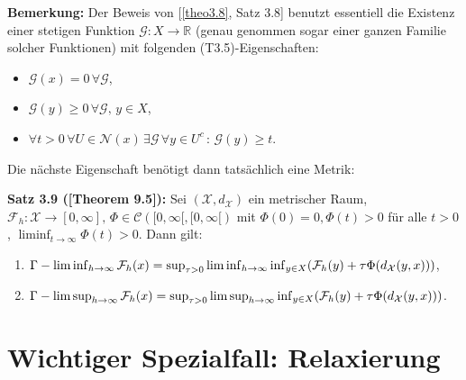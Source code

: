 \textbf{Bemerkung:} Der Beweis von [\ref{theo3.8}, Satz 3.8] benutzt essentiell die Existenz einer stetigen Funktion \(\mathcal{G} : X \to \mathbb{R}\) (genau genommen sogar einer ganzen Familie solcher Funktionen) mit folgenden (T3.5)-Eigenschaften:
\begin{itemize}
    \item \(\mathcal{G}(x)=0 \, \forall \mathcal{G}\),
    \item \(\mathcal{G}(y) \geq 0 \, \forall \mathcal{G}, \, y \in X\),
    \item \(\forall t > 0 \, \forall U \in \mathcal{N}(x) \, \exists \mathcal{G} \, \forall y \in U^c \, : \, \mathcal{G}(y) \geq t\).
\end{itemize}
Die nächste Eigenschaft benötigt dann tatsächlich eine Metrik:\\[0.5cm]
\colorbox{generalYellow}{\begin{minipage}{16cm}{\textcolor{black}{}{\label{theo3.9}}}
\textbf{Satz 3.9 (\cite{MasoGamma}[Theorem 9.5]):} Sei \((\mathcal{X},d_{\mathcal{X}})\) ein metrischer Raum, \(\mathcal{F}_h : \mathcal{X} \to [0,\infty], \, \Phi \in \mathcal{C}([0,\infty[,[0,\infty[)\) mit \(\Phi(0) = 0, \Phi(t) > 0 \) für alle \(t > 0\), \(\liminf_{t \to \infty} \Phi(t) > 0\). Dann gilt:
\begin{enumerate}
    \item \(\Gamma - \liminf_{h \to \infty} \mathcal{F}_h(x) = \sup_{\tau > 0} \liminf_{h \to \infty} \inf_{y \in X} (\mathcal{F}_h(y) + \tau \Phi(d_{\mathcal{X}}(y,x)))\),
    \item \(\Gamma - \limsup_{h \to \infty} \mathcal{F}_h(x) = \sup_{\tau > 0} \limsup_{h \to \infty} \inf_{y \in X} (\mathcal{F}_h(y) + \tau \Phi(d_{\mathcal{X}}(y,x)))\).
\end{enumerate}
\end{minipage}}
\section{Wichtiger Spezialfall: Relaxierung}{\label{sec:relax}}

